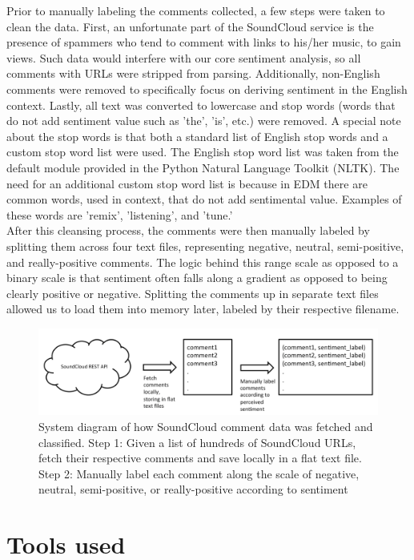 \documentclass[12pt]{dalcsthesis}
\begin{document}
Prior to manually labeling the comments collected, a few steps were taken to clean the data. First, an unfortunate part of the SoundCloud service is the presence of spammers who tend to comment with links to his/her music, to gain views. Such data would interfere with our core sentiment analysis, so all comments with URLs were stripped from parsing. Additionally, non-English comments were removed to specifically focus on deriving sentiment in the English context. Lastly, all text was converted to lowercase and stop words (words that do not add sentiment value such as 'the', 'is', etc.) were removed. A special note about the stop words is that both a standard list of English stop words and a custom stop word list were used. The English stop word list was taken from the default module provided in the Python Natural Language Toolkit (NLTK). The need for an additional custom stop word list is because in EDM there are common words, used in context, that do not add sentimental value. Examples of these words are 'remix', 'listening', and 'tune.' \\

After this cleansing process, the comments were then manually labeled by splitting them across four text files, representing negative, neutral, semi-positive, and really-positive comments. The logic behind this range scale as opposed to a binary scale is that sentiment often falls along a gradient as opposed to being clearly positive or negative. Splitting the comments up in separate text files allowed us to load them into memory later, labeled by their respective filename.

\begin{figure}[h]
\includegraphics[scale=.40]{training}
\centering
\caption{System diagram of how SoundCloud comment data was fetched and classified. Step 1: Given a list of hundreds of SoundCloud URLs, fetch their respective comments and save locally in a flat text file. Step 2: Manually label each comment along the scale of negative, neutral, semi-positive, or really-positive according to sentiment}
\end{figure}

\section{Tools used}
\end{document}
